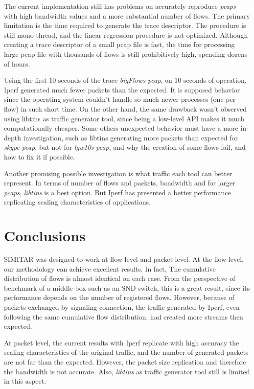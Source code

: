 The current implementation still has problems on accurately reproduce \textit{pcaps} with high bandwidth values and a more substantial number of flows. The primary limitation is the time required to generate the trace descriptor.  The procedure is still mono-thread, and the linear regression procedure is not optimized. Although creating a trace descriptor of a small pcap file is fast, the time for processing large pcap file with thousands of flows is still prohibitively high, spending dozens of hours. 

Using the first 10 seconds of the trace \textit{bigFlows-pcap}, on 10 seconds of operation, Iperf generated much fewer packets than the expected. It is supposed behavior since the operating system couldn't handle so much newer processes (one per flow) in such short time. On the other hand, the same drawback wasn't observed using libtins as traffic generator tool, since being a low-level API makes it much computationally cheaper.  Some others unexpected behavior must have a more in-depth investigation, such as libtins generating more packets than expected for \textit{skype-pcap}, but not for \textit{lgw10s-pcap}, and why the creation of some flows fail, and how to fix it if possible. 

Another promising possible investigation is what traffic each tool can better represent. In terms of number of flows and packets, bandwidth and for larger \textit{pcaps}, \textit{libtins} is a best option. But Iperf has presented a better performance replicating scaling characteristics of applications. 


\section{Conclusions}


SIMITAR was designed to work at flow-level and packet level. At the flow-level, our methodology can achieve excellent results. In fact,  The cumulative distribution of flows is almost identical on each case. From the perspective of benchmark of a middle-box such as an SND switch, this is a great result, since its performance depends on the number of registered flows. However, because of packets exchanged by signaling connection, the traffic generated by Iperf, even following the same cumulative flow distribution, had created more streams then expected. 

At packet level, the current results with Iperf replicate with high accuracy the scaling characteristics of the original traffic, and the number of generated packets are not far than the expected. However, the packet size replication and therefore the bandwidth is not accurate. Also, \textit{libtins} as traffic generator tool still is limited in this aspect.

